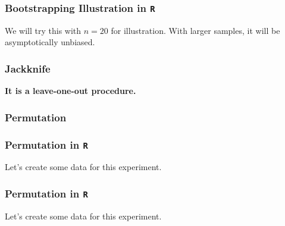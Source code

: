 \documentclass{beamer}\usepackage[]{graphicx}\usepackage[]{xcolor}
\begin{document}
\begin{frame}[fragile]
\frametitle{Bootstrapping Illustration in \texttt{R}}
We will try this with $n = 20$ for illustration. With larger samples, it will be asymptotically unbiased.

\end{frame}


\begin{frame}
\end{frame}

\begin{frame}
\frametitle{Jackknife}
\textbf{It is a leave-one-out procedure.}

\end{frame}

\begin{frame}
\frametitle{Permutation}

\end{frame}

\begin{frame}
\frametitle{Permutation in \texttt{R}}
Let's create some data for this experiment.
\end{frame}


\begin{frame}
\frametitle{Permutation in \texttt{R}}
Let's create some data for this experiment.
\end{frame}
\end{document}
